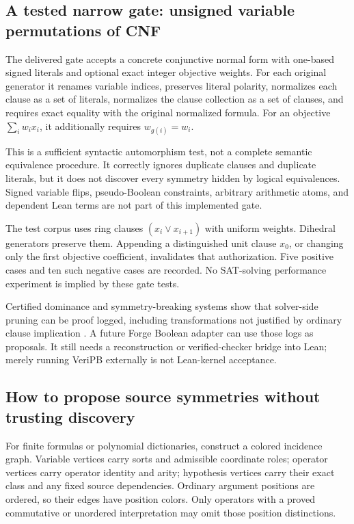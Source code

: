 \subsection{A tested narrow gate: unsigned variable permutations of CNF}
The delivered gate accepts a concrete conjunctive normal form with one-based signed literals and optional exact integer objective weights. For each original generator it renames variable indices, preserves literal polarity, normalizes each clause as a set of literals, normalizes the clause collection as a set of clauses, and requires exact equality with the original normalized formula. For an objective $\sum_i w_i x_i$, it additionally requires $w_{g(i)}=w_i$.

This is a sufficient syntactic automorphism test, not a complete semantic equivalence procedure. It correctly ignores duplicate clauses and duplicate literals, but it does not discover every symmetry hidden by logical equivalences. Signed variable flips, pseudo-Boolean constraints, arbitrary arithmetic atoms, and dependent Lean terms are not part of this implemented gate.

The test corpus uses ring clauses $(x_i\lor x_{i+1})$ with uniform weights. Dihedral generators preserve them. Appending a distinguished unit clause $x_0$, or changing only the first objective coefficient, invalidates that authorization. Five positive cases and ten such negative cases are recorded. No SAT-solving performance experiment is implied by these gate tests.

Certified dominance and symmetry-breaking systems show that solver-side pruning can be proof logged, including transformations not justified by ordinary clause implication \cite{cert-symmetry,aux-orders}. A future Forge Boolean adapter can use those logs as proposals. It still needs a reconstruction or verified-checker bridge into Lean; merely running VeriPB externally is not Lean-kernel acceptance.

\subsection{How to propose source symmetries without trusting discovery}
For finite formulas or polynomial dictionaries, construct a colored incidence graph. Variable vertices carry sorts and admissible coordinate roles; operator vertices carry operator identity and arity; hypothesis vertices carry their exact class and any fixed source dependencies. Ordinary argument positions are ordered, so their edges have position colors. Only operators with a proved commutative or unordered interpretation may omit those position distinctions.

